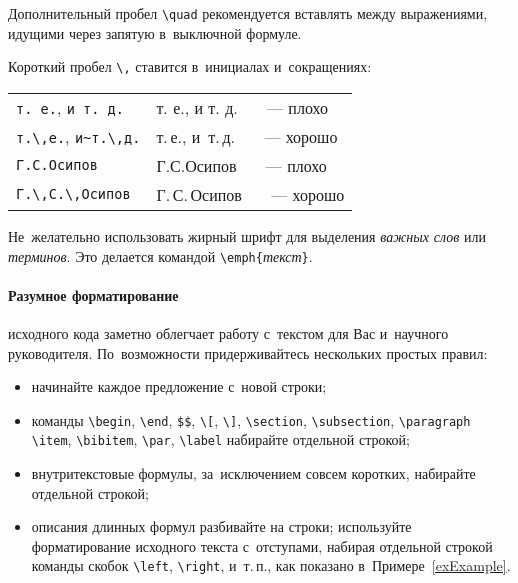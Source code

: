 Дополнительный пробел \verb'\quad' рекомендуется вставлять
между выражениями, идущими через запятую в~выключной формуле.

Короткий пробел \verb'\,' ставится в~инициалах и~сокращениях:
\begin{center}
\begin{tabular}{l|l}
    \verb'т. е.',  \verb'и т. д.'    & т. е.,  и т. д. ~~~--- плохо \\
    \verb'т.\,е.',  \verb'и~т.\,д.'  & т.\,е.,  и~т.\,д. ~~~--- хорошо\\
    \verb'Г.С.Осипов'              & Г.С.Осипов ~~~--- плохо \\
    \verb'Г.\,С.\,Осипов'          & Г.\,С.\,Осипов ~~~--- хорошо
\end{tabular}
\end{center}

Не~желательно использовать жирный шрифт для выделения
\emph{важных слов} или \emph{терминов}.
Это делается командой \verb'\emph{'\emph{текст}\verb'}'.

\paragraph{Разумное форматирование} исходного кода
заметно облегчает работу с~текстом для Вас и~научного руководителя.
По~возможности придерживайтесь нескольких простых правил:
\begin{itemize}
\item
    начинайте каждое предложение с~новой строки;
\item
    команды \verb'\begin', \verb'\end', \verb'$$', \verb'\[', \verb'\]',
    \verb'\section', \verb'\subsection', \verb'\paragraph'
    \verb'\item', \verb'\bibitem', \verb'\par', \verb'\label'
    набирайте отдельной строкой;
\item
    внутритекстовые формулы, за~исключением совсем коротких,
    набирайте отдельной строкой;
\item
    описания длинных формул разбивайте на строки;
    используйте форматирование исходного текста с~отступами,
    набирая отдельной строкой команды скобок
    \verb'\left', \verb'\right', и~т.\,п.,
    как показано в~Примере~\ref{exExample}.
\end{itemize}


